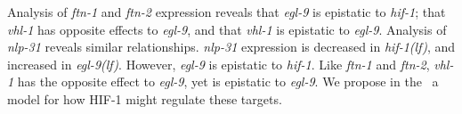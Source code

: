 \documentclass[10pt, onecolumn]{article}
\newcommand{\cel}{\emph{C.~elegans}}
\newcommand{\gene}[1]{\emph{#1}}
\newcommand{\nlp}{\emph{\mbox{nlp-31}}}
\newcommand{\ftna}{\emph{\mbox{ftn-1}}}
\newcommand{\ftnb}{\emph{\mbox{ftn-2}}}
\newcommand{\egl}{\emph{\mbox{egl-9}(lf)}}
\newcommand{\hif}{\emph{\mbox{hif-1(lf)}}}
\newcommand{\hifp}{HIF-1}
\begin{document}
Analysis of \ftna{} and \ftnb{} expression reveals that \gene{egl-9} is epistatic
to \gene{hif-1}; that \gene{vhl-1} has opposite effects to \gene{egl-9}, and that
\gene{vhl-1} is epistatic to \gene{egl-9}. Analysis of \nlp{} reveals similar
relationships. \nlp{} expression is decreased in \hif{}, and increased in \egl{}.
However, \gene{egl-9} is epistatic to \gene{hif-1}. Like \ftna{} and \ftnb{},
\gene{vhl-1} has the opposite effect to \gene{egl-9}, yet is epistatic to
\gene{egl-9}. We propose in the~ a model for how \hifp{}
might regulate these targets.

%
%
%
\end{document}
